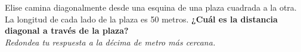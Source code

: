 \question[15]  Elise camina diagonalmente desde una esquina de una plaza cuadrada a la otra.
La longitud de cada lado de la plaza es 50 metros.
\textbf{¿Cuál es la distancia diagonal a través de la plaza?}\\
\textit{Redondea tu respuesta a la décima de metro más cercana.}
